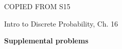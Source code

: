 \documentclass[handout]{mcs}
\begin{document}
\begin{staffnotes}
COPIED FROM S15

Intro to Discrete Probability, Ch. 16
\end{staffnotes}


 
\begin{center}
\textbf{\large Supplemental problems}
\end{center}
 



\end{document}
